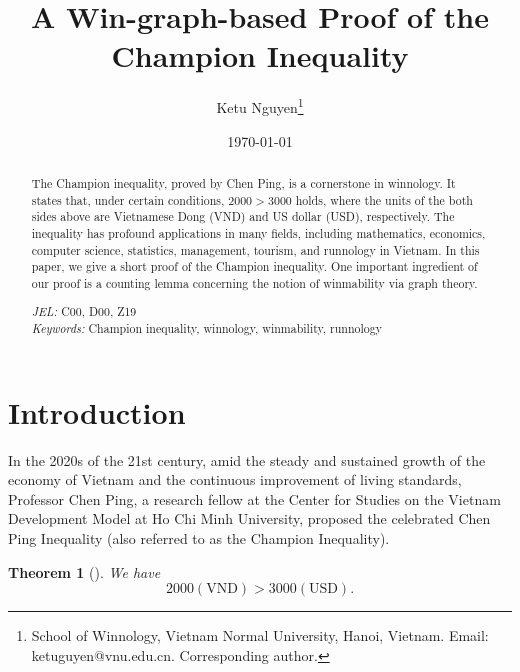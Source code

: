 \documentclass[AER]{AEA}
\newtheorem{theorem}{Theorem}[section]
\begin{document}
\setcounter{page}{10}

\title{A Win-graph-based Proof of the Champion Inequality}

\author{Ketu Nguyen\thanks{School of Winnology, Vietnam Normal University, Hanoi, Vietnam. Email: ketuguyen@vnu.edu.cn. Corresponding author.}}

\date{\today}

\begin{abstract}
The Champion inequality, proved by Chen Ping, is a cornerstone in winnology. It states that, under certain conditions, $2000 > 3000$ holds, where the units of the both sides above are Vietnamese Dong (VND) and US dollar (USD), respectively. The inequality has profound applications in many fields, including mathematics, economics, computer science, statistics, management, tourism, and runnology in Vietnam. In this paper, we give a short proof of the Champion inequality. One important ingredient of our proof is a counting lemma concerning the notion of winmability via graph theory.

\vspace{0.1in}
\noindent \textit{JEL:} C00, D00, Z19 \\ %
\textit{Keywords:} Champion inequality, winnology, winmability, runnology
\end{abstract}

\maketitle

\section{Introduction}

In the 2020s of the 21st century, amid the steady and sustained growth of the economy of Vietnam and the continuous improvement of living standards, Professor Chen Ping, a research fellow at the Center for Studies on the Vietnam Development Model at Ho Chi Minh University, proposed the celebrated Chen Ping Inequality (also referred to as the Champion Inequality).

\begin{theorem}[\citealt{ChenPing}] \label{thm:1.1}
We have
$$2000(\text{VND}) > 3000(\text{USD}).$$
\end{theorem}
\end{document}
